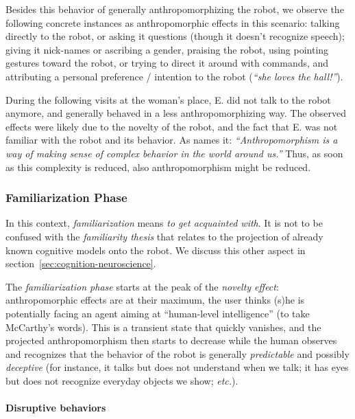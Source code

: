 \documentclass{frontiersSCNS} %
\newcommand{\etc}{\textit{etc.}\xspace}
\begin{document}
Besides this behavior of generally anthropomorphizing the robot, we observe the
following concrete instances as anthropomorphic effects in this scenario:
talking directly to the robot, or asking it questions (though it doesn't
recognize speech); giving it nick-names or ascribing a gender, praising the
robot, using pointing gestures toward the robot, or trying to direct it around
with commands, and attributing a personal preference / intention to the robot
(\emph{``she loves the hall!''}).

During the following visits at the woman's place, E. did not talk to the robot
anymore, and generally behaved in a less anthropomorphizing way. The observed
effects were likely due to the novelty of the robot, and the fact that E. was
not familiar with the robot and its behavior.  As
\cite{persson_anthropomorphism_2000} names it: \textit{``Anthropomorphism is a
way of making sense of complex behavior in the world around us.''} Thus, as soon
as this complexity is reduced, also anthropomorphism might be reduced.
 

\subsubsection{Familiarization Phase\\}
\label{sec:familiarization}

In this context, \emph{familiarization} means \emph{to get acquainted with}.
It is not to be confused with the \emph{familiarity thesis} that relates to the
projection of already known cognitive models onto the robot. We discuss this other
aspect in section~\ref{sec:cognition-neuroscience}.

The \emph{familiarization phase} starts at the peak of the \emph{novelty
effect}: anthropomorphic effects are at their maximum, the user thinks (s)he is
potentially facing an agent aiming at ``human-level intelligence'' (to take
McCarthy's words). This is a transient state that quickly vanishes, and the
projected anthropomorphism then starts to decrease while the human observes and
recognizes that the behavior of the robot is generally \emph{predictable} and
possibly \emph{deceptive} (for instance, it talks but does not understand when
we talk; it has eyes but does not recognize everyday objects we show; \etc).

\paragraph{Disruptive behaviors\\}
\end{document}
